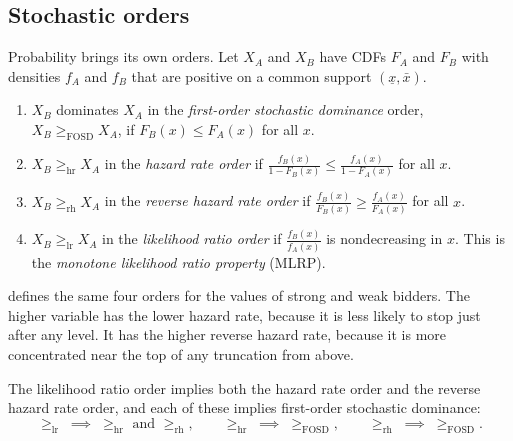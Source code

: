 \subsection{Stochastic orders}\label{sec:B-stochastic-orders}

Probability brings its own orders. Let $X_A$ and $X_B$ have CDFs $F_A$ and $F_B$ with densities $f_A$ and $f_B$ that are
positive on a common support $(\underline x, \bar x)$.

\begin{definition}\label{def:B-orders}
\leavevmode
\begin{enumerate}[label=(\roman*)]
  \item $X_B$ dominates $X_A$ in the \emph{first-order stochastic dominance} order, $X_B \geq_{\mathrm{FOSD}} X_A$, if
  $F_B(x) \leq F_A(x)$ for all $x$.
  \item $X_B \geq_{\mathrm{hr}} X_A$ in the \emph{hazard rate order} if $\frac{f_B(x)}{1 - F_B(x)} \leq \frac{f_A(x)}{1 - F_A(x)}$
  for all $x$.
  \item $X_B \geq_{\mathrm{rh}} X_A$ in the \emph{reverse hazard rate order} if $\frac{f_B(x)}{F_B(x)} \geq \frac{f_A(x)}{F_A(x)}$
  for all $x$.
  \item $X_B \geq_{\mathrm{lr}} X_A$ in the \emph{likelihood ratio order} if $\frac{f_B(x)}{f_A(x)}$ is nondecreasing in $x$.
  This is the \emph{monotone likelihood ratio property} (MLRP).
\end{enumerate}
\end{definition}

 defines the same four orders for the values of strong and weak bidders. The higher variable
has the lower hazard rate, because it is less likely to stop just after any level. It has the
higher reverse hazard rate, because it is more concentrated near the top of any truncation from above.

\begin{proposition}\label{prop:B-orders-chain}
The likelihood ratio order implies both the hazard rate order and the reverse hazard rate order, and each of these
implies first-order stochastic dominance:
\[
  \geq_{\mathrm{lr}} \;\implies\; \geq_{\mathrm{hr}} \text{ and } \geq_{\mathrm{rh}}, \qquad
  \geq_{\mathrm{hr}} \;\implies\; \geq_{\mathrm{FOSD}}, \qquad
  \geq_{\mathrm{rh}} \;\implies\; \geq_{\mathrm{FOSD}}.
\]
\end{proposition}

